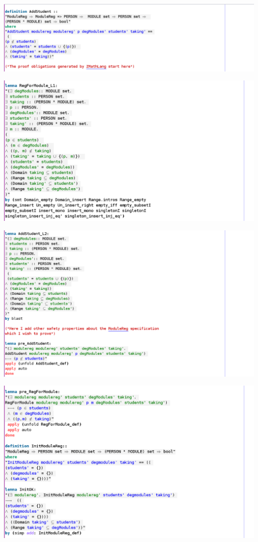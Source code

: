 \noindent \includegraphics[scale=0.5]{examples/modulereg/6imageb.png}

\noindent \includegraphics[scale=0.5]{examples/modulereg/6imagec.png}

\noindent \includegraphics[scale=0.5]{examples/modulereg/6imaged.png}

\noindent \includegraphics[scale=0.5]{examples/modulereg/6imagee.png}


